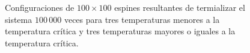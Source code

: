 \documentclass[11pt,a4paper]{article}
\begin{document}
\begin{figure}[h!]
\caption{Configuraciones de $100\times 100$ espines resultantes de termializar el sistema $100\, 000$ veces para tres temperaturas menores a la temperatura crítica y tres temperaturas mayores o iguales a la temperatura crítica.}
\label{fig:confs}
\end{figure}
\end{document}

